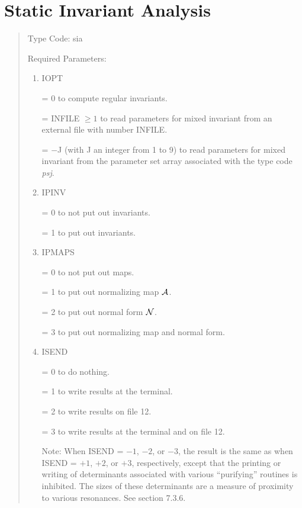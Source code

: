\section{Static Invariant Analysis} 
\begin{quotation}
\noindent     Type Code:  sia
\vspace{5mm}

\noindent Required Parameters:
\begin{enumerate}
      \item  IOPT

             = 0 to compute regular invariants.

             = INFILE $\geq 1$ to read parameters for mixed invariant from an
               external file \hspace*{1em}with number INFILE.

             = $-$J (with J an integer from 1 to 9) to read parameters for
               mixed invariant \hspace*{1em}from the parameter set array associated with
               the type code {\em psj}.

      \item  IPINV

               = 0 to not put out invariants.

               = 1 to put out invariants.

      \item  IPMAPS

             = 0 to not put out maps.

             = 1 to put out normalizing map ${\cal A}$.

             = 2 to put out normal form ${\cal N}$.

             = 3 to put out normalizing map and normal form.

      \item  ISEND

             = 0 to do nothing.

             = 1 to write results at the terminal.

             = 2 to write results on file 12.

             = 3 to write results at the terminal and on file 12.

             Note:  When ISEND = $-1$, $-2$, or $-3$, the result is the same as
             when ISEND = $+1$, $+2$, or $+3$, respectively, except that the
             printing or writing of determinants associated with various
             ``purifying'' routines is inhibited.  The sizes of these
             determinants are a measure of proximity to various resonances.  See section 7.3.6.


\end{enumerate}
\end{quotation}
